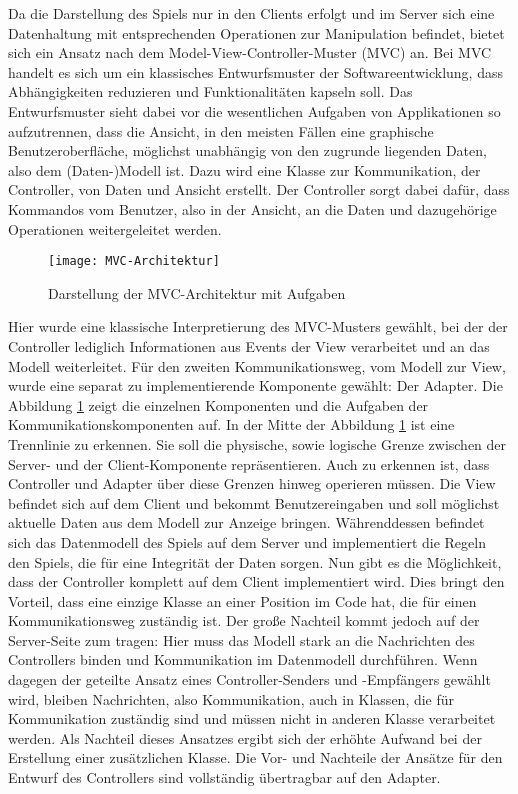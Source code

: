 \noindent Da die Darstellung des Spiels nur in den Clients erfolgt und im Server sich eine Datenhaltung mit entsprechenden Operationen zur Manipulation befindet, bietet sich ein Ansatz nach dem Model-View-Controller-Muster (MVC) an. Bei MVC handelt es sich um ein klassisches Entwurfsmuster der Softwareentwicklung, dass Abhängigkeiten reduzieren und Funktionalitäten kapseln soll. Das Entwurfsmuster sieht dabei vor die wesentlichen Aufgaben von Applikationen so aufzutrennen, dass die Ansicht, in den meisten Fällen eine graphische Benutzeroberfläche, möglichst unabhängig von den zugrunde liegenden Daten, also dem (Daten-)Modell ist. Dazu wird eine Klasse zur Kommunikation, der Controller, von Daten und Ansicht erstellt. Der Controller sorgt dabei dafür, dass Kommandos vom Benutzer, also in der Ansicht, an die Daten und dazugehörige Operationen weitergeleitet werden.
\begin{figure}[h]
	\centering
	\captionsetup{justification=centering}
	\texttt{[image: MVC-Architektur]}
	\caption[MVC]{Darstellung der MVC-Architektur mit Aufgaben}
	\label{fig:MVC}
\end{figure}
Hier wurde eine klassische Interpretierung des MVC-Musters gewählt, bei der der Controller lediglich Informationen aus Events der View verarbeitet und an das Modell weiterleitet. Für den zweiten Kommunikationsweg, vom Modell zur View, wurde eine separat zu implementierende Komponente gewählt: Der Adapter. Die Abbildung \ref{fig:MVC} zeigt die einzelnen Komponenten und die Aufgaben der Kommunikationskomponenten auf.
In der Mitte der Abbildung \ref{fig:MVC} ist eine Trennlinie zu erkennen. Sie soll die physische, sowie logische Grenze zwischen der Server- und der Client-Komponente repräsentieren. Auch zu erkennen ist, dass Controller und Adapter über diese Grenzen hinweg operieren müssen. Die View befindet sich auf dem Client und bekommt Benutzereingaben und soll möglichst aktuelle Daten aus dem Modell zur Anzeige bringen. Währenddessen befindet sich das Datenmodell des Spiels auf dem Server und implementiert die Regeln den Spiels, die für eine Integrität der Daten sorgen. Nun gibt es die Möglichkeit, dass der Controller komplett auf dem Client implementiert wird. Dies bringt den Vorteil, dass eine einzige Klasse an einer Position im Code hat, die für einen Kommunikationsweg zuständig ist. Der große Nachteil kommt jedoch auf der Server-Seite zum tragen: Hier muss das Modell stark an die Nachrichten des Controllers binden und Kommunikation im Datenmodell durchführen.  
Wenn dagegen der geteilte Ansatz eines Controller-Senders und -Empfängers gewählt wird, bleiben Nachrichten, also Kommunikation, auch in Klassen, die für Kommunikation zuständig sind und müssen nicht in anderen Klasse verarbeitet werden. Als Nachteil dieses Ansatzes ergibt sich der erhöhte Aufwand bei der Erstellung einer zusätzlichen Klasse. Die Vor- und Nachteile der Ansätze für den Entwurf des Controllers sind vollständig übertragbar auf den Adapter.\\
